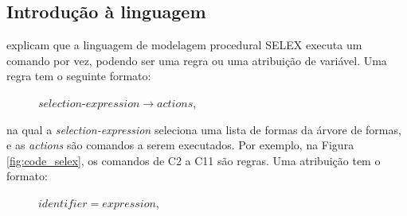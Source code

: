 \begin{figure}[h!]
	\centering
	\captionsetup{width=15cm}
	{}	
\end{figure}

\subsection{Introdução à linguagem}
\label{sec:introducao_selex}

 explicam que a linguagem de modelagem procedural \gls{SELEX} executa um comando por vez, podendo ser uma regra ou uma atribuição de variável. Uma regra tem o seguinte formato:

\vspace{0.3cm}

\begin{description}
    \item[] \qquad \qquad $selection\mbox{-}expression \rightarrow actions$,
\end{description}

\vspace{0.3cm}

\noindent na qual a \textit{selection-expression} seleciona uma lista de formas da árvore de formas, e as \textit{actions} são comandos a serem executados. Por exemplo, na Figura \ref{fig:code_selex}, os comandos de C2 a C11 são regras. Uma atribuição tem o formato:

\vspace{0.3cm}

\begin{description}
    \item[] \qquad \qquad $identifier = expression$,
\end{description}

